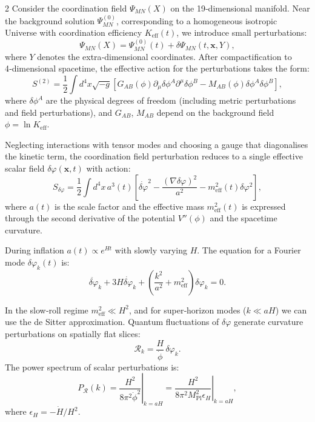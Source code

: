 \documentclass[12pt,a4paper]{article}
\newcommand{\Keff}{K_{\mathrm{eff}}}
\newcommand{\Mpl}{M_{\mathrm{Pl}}}
\begin{document}
	\begin{multicols}{2}
		Consider the coordination field \(\Psi_{MN}(X)\) on the 19‑dimensional manifold. Near the background solution \(\Psi^{(0)}_{MN}\), corresponding to a homogeneous isotropic Universe with coordination efficiency \(\Keff(t)\), we introduce small perturbations:
		\begin{equation}
			\Psi_{MN}(X) = \Psi^{(0)}_{MN}(t) + \delta\Psi_{MN}(t,\mathbf{x},Y),
		\end{equation}
		where \(Y\) denotes the extra‑dimensional coordinates. After compactification to 4‑dimensional spacetime, the effective action for the perturbations takes the form:
		\begin{equation}
			S^{(2)} = \frac{1}{2} \int d^4x \sqrt{-g} \left[ G_{AB}(\phi) \partial_\mu \delta\phi^A \partial^\mu \delta\phi^B - M_{AB}(\phi) \delta\phi^A \delta\phi^B \right],
		\end{equation}
		where \(\delta\phi^A\) are the physical degrees of freedom (including metric perturbations and field perturbations), and \(G_{AB}\), \(M_{AB}\) depend on the background field \(\phi = \ln\Keff\).
		
		Neglecting interactions with tensor modes and choosing a gauge that diagonalises the kinetic term, the coordination field perturbation reduces to a single effective scalar field \(\delta\varphi(\mathbf{x},t)\) with action:
		\begin{equation}
			S_{\delta\varphi} = \frac{1}{2} \int d^4x \, a^3(t) \left[ \dot{\delta\varphi}^2 - \frac{(\nabla\delta\varphi)^2}{a^2} - m_{\mathrm{eff}}^2(t) \delta\varphi^2 \right],
		\end{equation}
		where \(a(t)\) is the scale factor and the effective mass \(m_{\mathrm{eff}}^2(t)\) is expressed through the second derivative of the potential \(V''(\phi)\) and the spacetime curvature.
		
		During inflation \(a(t) \propto e^{Ht}\) with slowly varying \(H\). The equation for a Fourier mode \(\delta\varphi_k(t)\) is:
		\begin{equation}
			\ddot{\delta\varphi}_k + 3H\dot{\delta\varphi}_k + \left( \frac{k^2}{a^2} + m_{\mathrm{eff}}^2 \right) \delta\varphi_k = 0.
		\end{equation}
		
		In the slow‑roll regime \(m_{\mathrm{eff}}^2 \ll H^2\), and for super‑horizon modes (\(k \ll aH\)) we can use the de Sitter approximation. Quantum fluctuations of \(\delta\varphi\) generate curvature perturbations on spatially flat slices:
		\begin{equation}
			\mathcal{R}_k = \frac{H}{\dot{\phi}} \, \delta\varphi_k.
		\end{equation}
		The power spectrum of scalar perturbations is:
		\begin{equation}
			P_{\mathcal{R}}(k) = \left. \frac{H^2}{8\pi^2 \dot{\phi}^2} \right|_{k=aH} = \left. \frac{H^2}{8\pi^2 \Mpl^2 \epsilon_H} \right|_{k=aH},
		\end{equation}
		where \(\epsilon_H = -\dot{H}/H^2\).
		

\end{multicols}
\end{document}

